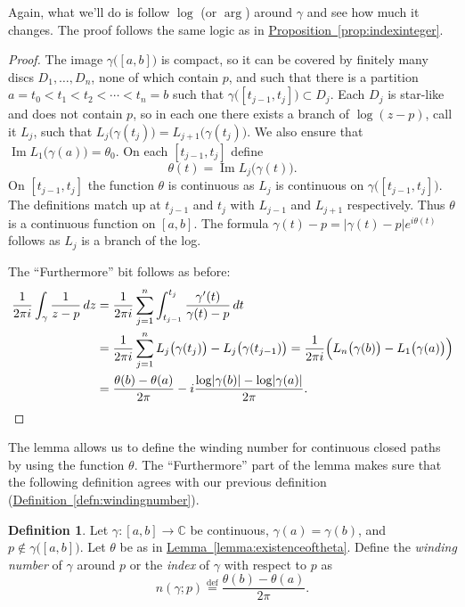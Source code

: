 \documentclass[12pt,openany]{book}
\renewcommand{\Im}{\operatorname{Im}}
\newcommand{\sabs}[1]{\lvert {#1} \rvert}
\newcommand{\C}{{\mathbb{C}}}
\newcommand{\myindex}[1]{#1\index{#1}}
\newcommand{\myquote}[1]{``#1''}
\theoremstyle{plain}
\theoremstyle{remark}
\theoremstyle{definition}
\newtheorem{defn}[thm]{Definition}
\theoremstyle{exercise}
\theoremstyle{example}
\newcommand{\propref}[1]{\hyperref[#1]{Proposition~\ref*{#1}}}
\newcommand{\lemmaref}[1]{\hyperref[#1]{Lemma~\ref*{#1}}}
\newcommand{\defnref}[1]{\hyperref[#1]{Definition~\ref*{#1}}}
\begin{document}
Again, what we'll do is follow $\log$ (or $\arg$) around $\gamma$ and see
how much it changes.  The proof follows the same logic as in
\propref{prop:indexinteger}.

\begin{proof}
The image $\gamma\bigl([a,b]\bigr)$ is compact, so it can be covered by finitely many
discs $D_1,\ldots,D_n$, none of which contain $p$, and such that there is a
partition $a = t_0 < t_1 < t_2 < \cdots < t_n = b$ such that
$\gamma\bigl([t_{j-1},t_j]\bigr) \subset D_j$.  Each $D_j$ is star-like and
does not contain $p$,
so in each one there exists a branch of $\log (z-p)$, call it $L_j$,
such that $L_j\bigl(\gamma(t_j)\bigr) = L_{j+1}\bigl(\gamma(t_j)\bigr)$.
We also ensure that $\Im L_1\bigl(\gamma(a)\bigr) = \theta_0$.
On each $[t_{j-1},t_j]$ define
\begin{equation*}
\theta(t)
=
\Im L_j\bigl(\gamma(t)\bigr) .
\end{equation*}
On $[t_{j-1},t_j]$ the function $\theta$ is continuous as $L_j$ is continuous on 
$\gamma\bigl([t_{j-1},t_j]\bigr)$.  The definitions match up at $t_{j-1}$
and $t_{j}$ with $L_{j-1}$ and $L_{j+1}$ respectively.  Thus
$\theta$ is a continuous function on $[a,b]$.
The formula $\gamma(t)-p = \sabs{\gamma(t)-p} e^{i\theta(t)}$ follows as
$L_j$ is a branch of the log.

The \myquote{Furthermore} bit follows as before:
\begin{equation*}
\begin{split}
\frac{1}{2\pi i} \int_\gamma \frac{1}{z-p} \, dz
& =
\frac{1}{2\pi i} \sum_{j=1}^n \int_{t_{j-1}}^{t_j} \frac{\gamma'(t)}{\gamma(t)-p} \, dt
\\
& =
\frac{1}{2\pi i} \sum_{j=1}^n L_j\bigl(\gamma(t_j)\bigr) -
L_j\bigl(\gamma(t_{j-1})\bigr)
=
\frac{1}{2\pi i} \Bigl( L_n\bigl(\gamma(b)\bigr) - L_1\bigl(\gamma(a)\bigr) \Bigr) 
\\
& =
\frac{\theta(b)-\theta(a)}{2\pi}
- i \frac{\log \sabs{\gamma(b)} - \log \sabs{\gamma(a)}}{2\pi} .
\qedhere
\end{split}
\end{equation*}
\end{proof}

The lemma allows us to define the winding number for continuous closed paths
by using the function $\theta$.  The \myquote{Furthermore} part of the
lemma makes sure that the following definition agrees with our previous
definition (\defnref{defn:windingnumber}).

\begin{defn}
Let $\gamma \colon [a,b] \to \C$ be continuous, $\gamma(a) = \gamma(b)$, and
$p \notin \gamma\bigl([a,b]\bigr)$.  Let $\theta$ be as in
\lemmaref{lemma:existenceoftheta}.  Define the
\emph{\myindex{winding number}} of $\gamma$ around $p$ or
the \emph{\myindex{index}} of $\gamma$ with respect to $p$
as
%
\begin{equation*}
n(\gamma;p)
\overset{\text{def}}{=}
\frac{\theta(b)-\theta(a)}{2\pi}.
\end{equation*}
\end{defn}
\end{document}
